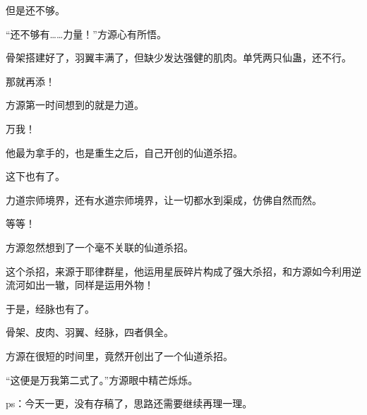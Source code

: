 \begin{this_body}
但是还不够。

“还不够有……力量！”方源心有所悟。

骨架搭建好了，羽翼丰满了，但缺少发达强健的肌肉。单凭两只仙蛊，还不行。

那就再添！

方源第一时间想到的就是力道。

万我！

他最为拿手的，也是重生之后，自己开创的仙道杀招。

这下也有了。

力道宗师境界，还有水道宗师境界，让一切都水到渠成，仿佛自然而然。

等等！

方源忽然想到了一个毫不关联的仙道杀招。

这个杀招，来源于耶律群星，他运用星辰碎片构成了强大杀招，和方源如今利用逆流河如出一辙，同样是运用外物！

于是，经脉也有了。

骨架、皮肉、羽翼、经脉，四者俱全。

方源在很短的时间里，竟然开创出了一个仙道杀招。

“这便是万我第二式了。”方源眼中精芒烁烁。

ps：今天一更，没有存稿了，思路还需要继续再理一理。

\end{this_body}

